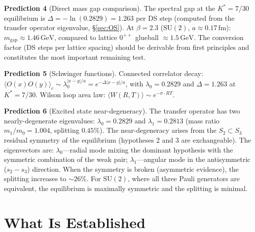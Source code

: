 \documentclass[11pt,a4paper]{article}
\theoremstyle{definition}
\theoremstyle{remark}
\newcommand{\SU}{\mathrm{SU}}
\begin{document}
\textbf{Prediction 4} (Direct mass gap comparison). The spectral gap at the $K^*=7/30$ equilibrium is $\Delta=-\ln(0.2829)=1.263$ per DS step (computed from the transfer operator eigenvalue, \S\ref{sec:OS}). At $\beta=2.3$ ($\SU(2)$, $a\approx 0.17\,\mathrm{fm}$): $m_{\mathrm{gap}}\approx 1.46\,\mathrm{GeV}$, compared to lattice $0^{++}$ glueball $\approx 1.5\,\mathrm{GeV}$. The conversion factor (DS steps per lattice spacing) should be derivable from first principles and constitutes the most important remaining test.

\textbf{Prediction 5} (Schwinger functions). Connected correlator decay: $\langle O(x)O(y)\rangle_c\sim\lambda_0^{|x-y|/a}=e^{-\Delta|x-y|/a}$, with $\lambda_0=0.2829$ and $\Delta=1.263$ at $K^*=7/30$. Wilson loop area law: $\langle W(R,T)\rangle\sim e^{-\sigma\cdot RT}$.

\textbf{Prediction 6} (Excited state near-degeneracy). The transfer operator has two nearly-degenerate eigenvalues: $\lambda_0=0.2829$ and $\lambda_1=0.2813$ (mass ratio $m_1/m_0=1.004$, splitting $0.45\%$). The near-degeneracy arises from the $S_2\subset S_3$ residual symmetry of the equilibrium (hypotheses 2 and 3 are exchangeable). The eigenvectors are: $\lambda_0$---radial mode mixing the dominant hypothesis with the symmetric combination of the weak pair; $\lambda_1$---angular mode in the antisymmetric ($s_2-s_3$) direction. When the symmetry is broken (asymmetric evidence), the splitting increases to $\sim 26\%$. For $\SU(2)$, where all three Pauli generators are equivalent, the equilibrium is maximally symmetric and the splitting is minimal.


\section{What Is Established}\label{sec:established}
\end{document}
